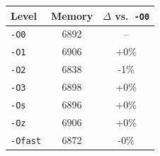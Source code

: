 \begin{tabular*}{\columnwidth}{@{\extracolsep\fill}lcc@{\extracolsep\fill}}
\toprule
\textbf{Level} & \textbf{Memory} & \textbf{$\Delta$ vs.\ \texttt{-O0}} \\
\midrule
\texttt{-O0} & 6892 & -- \\
\texttt{-O1} & 6906 & +0\% \\
\texttt{-O2} & 6838 & -1\% \\
\texttt{-O3} & 6898 & +0\% \\
\texttt{-Os} & 6896 & +0\% \\
\texttt{-Oz} & 6906 & +0\% \\
\texttt{-Ofast} & 6872 & -0\% \\
\bottomrule
\end{tabular*}
